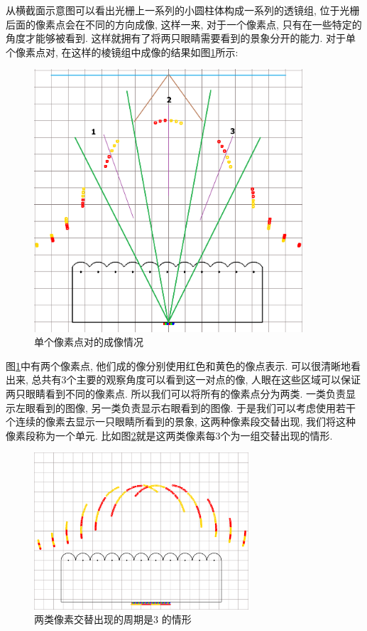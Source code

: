 \documentclass[a4paper, 11pt]{article}
\begin{document}
\begin{CJK}{UTF8}{gbsn}
从横截面示意图可以看出光栅上一系列的小圆柱体构成一系列的透镜组, 位于光栅后面的像素点会在不同的方向成像, 这样一来, 对于一个像素点, 只有在一些特定的角度才能够被看到. 这样就拥有了将两只眼睛需要看到的景象分开的能力. 对于单个像素点对, 在这样的棱镜组中成像的结果如图\ref{fig:217}所示:
\begin{figure}[h!]
  \centerline{\includegraphics[width=10cm]{217.png}}
  \caption{单个像素点对的成像情况}
  \label{fig:217}
\end{figure}

图\ref{fig:217}中有两个像素点, 他们成的像分别使用红色和黄色的像点表示. 可以很清晰地看出来, 总共有3个主要的观察角度可以看到这一对点的像, 人眼在这些区域可以保证两只眼睛看到不同的像素点. 所以我们可以将所有的像素点分为两类. 一类负责显示左眼看到的图像, 另一类负责显示右眼看到的图像. 于是我们可以考虑使用若干个连续的像素去显示一只眼睛所看到的景象, 这两种像素段交替出现, 我们将这种像素段称为一个单元. 比如图\ref{fig:223}就是这两类像素每3个为一组交替出现的情形.
\begin{figure}[h!]
  \centerline{\includegraphics[width=8cm]{223.png}}
  \caption{两类像素交替出现的周期是3 的情形}
  \label{fig:223}
\end{figure}


\end{CJK}
\end{document}
